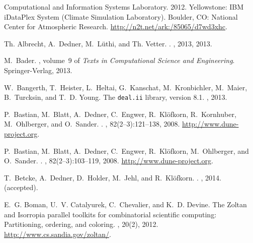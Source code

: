 \documentclass[10pt,notitlepage,a4paper]{article}
\begin{document}
\begin{thebibliography}{10}

{C}omputational and {I}nformation {S}ystems {L}aboratory. 2012. {Y}ellowstone:
  {IBM} {iDataPlex} {S}ystem ({C}limate {S}imulation {L}aboratory). {B}oulder,
  {CO}: {National Center for Atmospheric Research}.
\newblock \url{http://n2t.net/ark:/85065/d7wd3xhc}.

Th. Albrecht, A.~Dedner, M.~L{\"u}thi, and Th. Vetter.
.
, 2013, 2013.

M.~Bader.
, volume~9 of {\em {Texts in Computational Science and
  Engineering}}.
\newblock Springer-Verlag, 2013.

W.~Bangerth, T.~Heister, L.~Heltai, G.~Kanschat, M.~Kronbichler, M.~Maier,
  B.~Turcksin, and T.~D. Young.
\newblock The {\tt deal.{i}{i}} library, version 8.1.
, 2013.

P.~Bastian, M.~Blatt, A.~Dedner, C.~Engwer, R.~Kl{\"o}fkorn, R.~Kornhuber,
  M.~Ohlberger, and O.~Sander.
.
, 82(2--3):121--138, 2008.
\newblock \url{http://www.dune-project.org}.

P.~Bastian, M.~Blatt, A.~Dedner, C.~Engwer, R.~Kl{\"o}fkorn, M.~Ohlberger, and
  O.~Sander.
.
, 82(2--3):103--119, 2008.
\newblock \url{http://www.dune-project.org}.

T.~Betcke, A.~Dedner, D.~Holder, M.~Jehl, and R.~Kl{\"o}fkorn.
.
, 2014.
\newblock (accepted).

E.~G. Boman, U.~V. Catalyurek, C.~Chevalier, and K.~D. Devine.
\newblock The {Z}oltan and {I}sorropia parallel toolkits for combinatorial
  scientific computing: Partitioning, ordering, and coloring.
, 20(2), 2012.
\newblock \url{http://www.cs.sandia.gov/zoltan/}.


\end{thebibliography}
\end{document}
